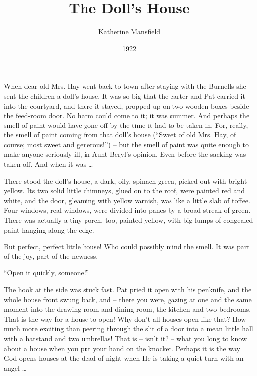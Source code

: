 \documentclass[10pt,a4paper]{article}
\begin{document}
\title{The Doll’s House}
\date{1922}
\author{Katherine Mansfield}
\maketitle
    
\pagestyle{empty}
\thispagestyle{empty}
\linenumbers
When dear old Mrs. Hay went back to town after staying with the Burnells she sent the children a doll’s house. It was so big that the carter and Pat carried it into the courtyard, and there it stayed, propped up on two wooden boxes beside the feed-room door. No harm could come to it; it was summer. And perhaps the smell of paint would have gone off by the time it had to be taken in. For, really, the smell of paint coming from that doll’s house (“Sweet of old Mrs. Hay, of course; most sweet and generous!”) – but the smell of paint was quite enough to make anyone seriously ill, in Aunt Beryl’s opinion. Even before the sacking was taken off. And when it was …

There stood the doll’s house, a dark, oily, spinach green, picked out with bright yellow. Its two solid little chimneys, glued on to the roof, were painted red and white, and the door, gleaming with yellow varnish, was like a little slab of toffee. Four windows, real windows, were divided into panes by a broad streak of green. There was actually a tiny porch, too, painted yellow, with big lumps of congealed paint hanging along the edge.

But perfect, perfect little house! Who could possibly mind the smell. It was part of the joy, part of the newness.

“Open it quickly, someone!”

The hook at the side was stuck fast. Pat pried it open with his penknife, and the whole house front swung back, and – there you were, gazing at one and the same moment into the drawing-room and dining-room, the kitchen and two bedrooms. That is the way for a house to open! Why don’t all houses open like that? How much more exciting than peering through the slit of a door into a mean little hall with a hatstand and two umbrellas! That is – isn’t it? – what you long to know about a house when you put your hand on the knocker. Perhaps it is the way God opens houses at the dead of night when He is taking a quiet turn with an angel …
\end{document}
